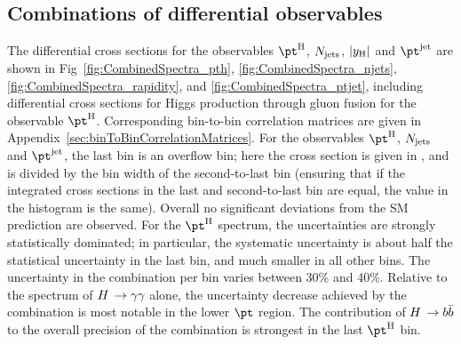 \subsection{Combinations of differential observables}
\label{sec:noncouplingresults}

The differential cross sections for the observables $\pth$, $N_\text{jets}$, $\left|y_\text{H}\right|$ and $\ptjet$ are shown in
Fig~\ref{fig:CombinedSpectra_pth}, \ref{fig:CombinedSpectra_njets}, \ref{fig:CombinedSpectra_rapidity}, and \ref{fig:CombinedSpectra_ptjet}, including differential cross sections for Higgs production through gluon fusion for the observable $\pth$.
% 
Corresponding bin-to-bin correlation matrices are given in Appendix~\ref{sec:binToBinCorrelationMatrices}.
% 
For the observables $\pth$, $N_\text{jets}$ and $\ptjet$, the last bin is an overflow bin; here the cross section is given in \pb, and is divided by the bin width of the second-to-last bin (ensuring that if the integrated cross sections in the last and second-to-last bin are equal, the value in the histogram is the same).
% 
Overall no significant deviations from the SM prediction are observed.
% 
For the $\pth$ spectrum, the uncertainties are strongly statistically dominated; in particular, the systematic uncertainty is about half the statistical uncertainty in the last bin, and much smaller in all other bins.
% 
The uncertainty in the combination per bin varies between 30\% and 40\%.
% 
Relative to the spectrum of $H\,\to\gamma\gamma$ alone, the uncertainty decrease achieved by the combination is most notable in the lower $\pt$ region.
% 
% 
The contribution of $H\,\to b\bar{b}$ to the overall precision of the combination is strongest in the last $\pth$ bin.

